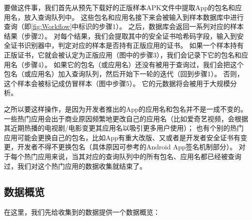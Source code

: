 要做这件事，我们首先从预先下载好的正版样本APK文件中提取App的包名和应用名，放入查询队列中。
这些包名和应用名接下来会被输入到样本数据库中进行查询（即\autoref{fig:Workflow}中标识的步骤1）。
之后，数据库会返回一系列对应的样本结果（步骤2）。
对每个结果，我们会提取其中的安全证书哈希码字段，输入到安全证书识别器中，判定对应的样本是否持有正版应用的证书。
如果一个样本持有正版证书，它就会被认定为正版应用（图中的步骤3），我们会记录下它的包名和应用名（步骤4）。
如果它的包名（或应用名）还没有被用于查询过，我们会把这个包名（或应用名）加入查询队列，然后开始下一轮的迭代（回到步骤1）。
否则，这个样本会被标记成仿冒样本（图中步骤5）。
它的元数据将会被用于大规模分析。

之所以要这样操作，是因为开发者推出的App的应用名和包名并不是一成不变的。
一些热门应用会出于商业原因频繁地更改自己的应用名（比如爱奇艺视频，会根据其近期热播的电视剧/电影变更其应用名以吸引更多用户使用）；
也有个别的热门应用可能会更换自己的包名，比如App有重大改版、又或者是开发者安全证书有变更，开发者不得不更换包名（具体原因可参考的Android App签名机制部分）。
对于每个热门应用来说，当其对应的查询队列中的所有包名、应用名都已经被查询过，我们对这个热门应用的数据收集就结束了。

\subsection{数据概览}
在这里，我们先给收集到的数据提供一个数据概览：

